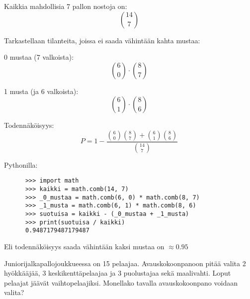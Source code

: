 \documentclass[12pt,a4paper]{article}
\begin{document}
\begin{kohta}
  Kaikkia mahdollisia 7 pallon nostoja on:
  \[
  \binom{14}{7}
  \]

  Tarkastellaan tilanteita, joissa ei saada vähintään kahta mustaa:

  \begin{alakohta}
    \item 0 mustaa (7 valkoista):
    \[
    \binom{6}{0} \cdot \binom{8}{7}
    \]

    \item 1 musta (ja 6 valkoista):
    \[
    \binom{6}{1} \cdot \binom{8}{6}
    \]
  \end{alakohta}

\vspace{0.8cm}

  Todennäköisyys:
  \[
P = 1 - \frac{\binom{6}{0}\binom{8}{7} + \binom{6}{1}\binom{8}{6}}{\binom{14}{7}}
  \]

    Pythonilla:
    \begin{verbatim}
      >>> import math
      >>> kaikki = math.comb(14, 7)
      >>> _0_mustaa = math.comb(6, 0) * math.comb(8, 7)
      >>> _1_musta = math.comb(6, 1) * math.comb(8, 6)
      >>> suotuisa = kaikki - (_0_mustaa + _1_musta)
      >>> print(suotuisa / kaikki)
      0.9487179487179487
    \end{verbatim}
Eli todennäköisyys saada vähintään kaksi mustaa on $\approx 0.95$

\end{kohta}


\newpage
{}
Juniorijalkapallojoukkueessa on 15 pelaajaa.
Avauskokoonpanoon pitää valita 2 hyökkääjää,
3 keskikenttäpelaajaa ja 3 puolustajaa sekä maalivahti.
Loput pelaajat jäävät vaihtopelaajiksi.
Monellako tavalla avauskokoonpano voidaan valita? 
\end{document}
